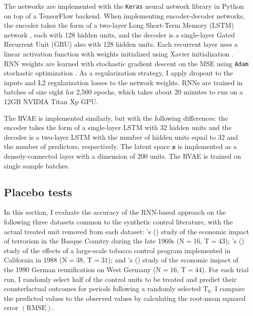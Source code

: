 \documentclass[hidelinks,12pt]{article}
\newcommand{\possessivecite}[1]{\citeauthor{#1}'s (\citeyear{#1})}
\begin{document}
The networks are implemented with the \texttt{Keras} neural network library \citep{chollet2015keras} in Python on top of a TensorFlow backend. When implementing encoder-decoder networks, the encoder takes the form of a two-layer Long Short-Term Memory (LSTM) network \citep{schmidhuber1997long}, each with 128 hidden units, and the decoder is a single-layer Gated Recurrent Unit (GRU) \citep{chung2014} also with 128 hidden units. Each recurrent layer uses a linear activation function with weights initialized using Xavier initialization \citep{glorot2010}. RNN weights are learned with stochastic gradient descent on the MSE using \texttt{Adam} stochastic optimization \citep{kingma2014adam}. As a regularization strategy, I apply dropout to the inputs and L2 regularization losses to the network weights. RNNs are trained in batches of size eight for 2,500 epochs, which takes about 20 minutes to run on a 12GB NVIDIA Titan Xp GPU.

The RVAE is implemented similarly, but with the following differences: the encoder takes the form of a single-layer LSTM with 32 hidden units and the decoder is a two-layer LSTM with the number of hidden units equal to 32 and the number of predictors, respectively. The latent space $\boldsymbol{z}$ is implemented as a densely-connected layer with a dimension of 200 units. The RVAE is trained on single sample batches. 

\subsection{Placebo tests} \label{placebo}

In this section, I evaluate the accuracy of the RNN-based approach on the following three datasets common to the synthetic control literature, with the actual treated unit removed from each dataset: \possessivecite{abadie2003economic} study of the economic impact of terrorism in the Basque Country during the late 1960s ($\text{N}=16$, $\text{T}=43$); \possessivecite{abadie2010synthetic} study of the effects of a large-scale tobacco control program implemented in California in 1988 ($\text{N}=38$, $\text{T}=31$); and \possessivecite{abadie2015comparative} study of the economic impact of the 1990 German reunification on West Germany ($\text{N}=16$, $\text{T}=44$). For each trial run, I randomly select half of the control units to be treated and predict their counterfactual outcomes for periods following a randomly selected $\text{T}_0$. I compare the predicted values to the observed values by calculating the root-mean squared error $(\text{RMSE})$. 
\end{document}
